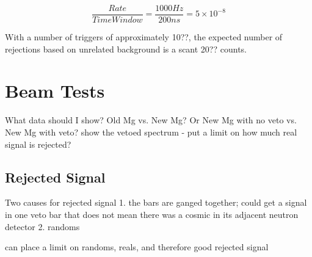 \begin{equation}
\frac{Rate}{Time Window} = \frac{1000 Hz}{200 ns} = 5\times10^{-8}
\end{equation}

With a number of triggers of approximately 10??, the expected number of rejections based on unrelated background is a scant 20?? counts.

\section{Beam Tests}
What data should I show?  Old Mg vs. New Mg?  Or New Mg with no veto vs.  New Mg with veto?
show the vetoed spectrum - put a limit on how much real signal is rejected?

\subsection{Rejected Signal}
Two causes for rejected signal
1. the bars are ganged together; could get a signal in one veto bar that does not mean there was a cosmic in its adjacent neutron detector
2. randoms

can place a limit on randoms, reals, and therefore good rejected signal

%
% 
% 
